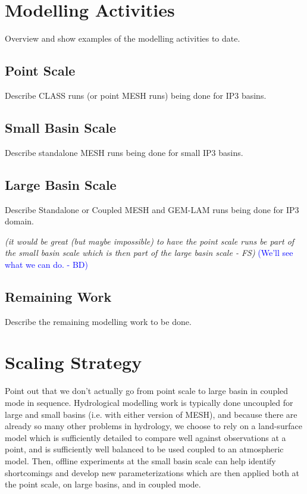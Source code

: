 \documentclass[hess]{copernicus}
\begin{document}
\section{Modelling Activities}
Overview and show examples of the modelling activities to date.

\subsection{Point Scale}
Describe CLASS runs (or point MESH runs) being done for IP3 basins.

\subsection{Small Basin Scale}
Describe standalone MESH runs being done for small IP3 basins.

\subsection{Large Basin Scale}
Describe Standalone or Coupled MESH and GEM-LAM runs being done for IP3 domain.

{\em (it would be great (but maybe impossible) to have the point scale runs be part of the small basin scale which is then part of the large basin scale - FS)}\textcolor{blue}{ (We'll see what we can do. - BD) }

\subsection{Remaining Work}
Describe the remaining modelling work to be done.

\section{Scaling Strategy}
Point out that we don't actually go from point scale to large basin in coupled mode in sequence. Hydrological modelling work is typically done uncoupled for large and small basins (i.e. with either version of MESH), and because there are already so many other problems in hydrology, we choose to rely on a land-surface model which is sufficiently detailed to compare well against observations at a point, and is sufficiently well balanced to be used coupled to an atmospheric model. Then, offline experiments at the small basin scale can help identify shortcomings and develop new parameterizations which are then applied both at the point scale, on large basins, and in coupled mode.
\end{document}
